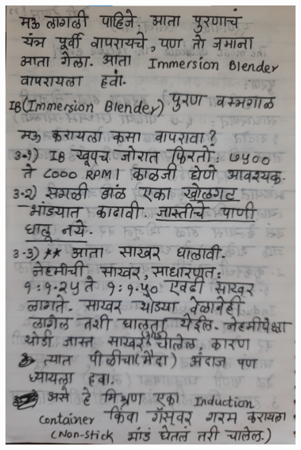 \documentclass[17pt]{extarticle}  %
\begin{document}
\begin{figure}[h!]
    \centering
    \includegraphics{img/02-s.png}
\end{figure}
\end{document}
